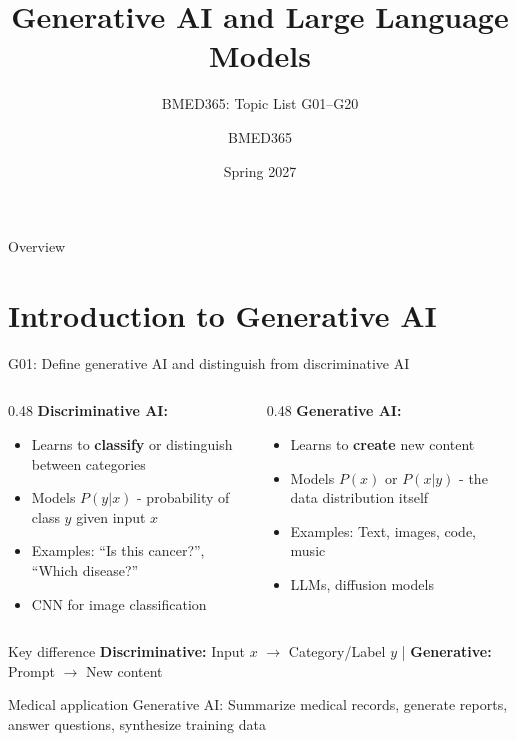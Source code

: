 \documentclass[aspectratio=169, 10pt]{beamer}
\title{Generative AI and Large Language Models}
\subtitle{BMED365: Topic List G01--G20}
\author{BMED365}
\date{Spring 2027}
\begin{document}
\begin{frame}
    \titlepage
\end{frame}

\begin{frame}{Overview}
    \tableofcontents
\end{frame}

\section{Introduction to Generative AI}

\begin{frame}{G01: Define generative AI and distinguish from discriminative AI}
    \begin{columns}[T]
        \begin{column}{0.48\textwidth}
            \textbf{Discriminative AI:}
            \begin{itemize}
                \item Learns to \textbf{classify} or distinguish between categories
                \item Models $P(y|x)$ - probability of class $y$ given input $x$
                \item Examples: ``Is this cancer?'', ``Which disease?''
                \item CNN for image classification
            \end{itemize}
        \end{column}
        \begin{column}{0.48\textwidth}
            \textbf{Generative AI:}
            \begin{itemize}
                \item Learns to \textbf{create} new content
                \item Models $P(x)$ or $P(x|y)$ - the data distribution itself
                \item Examples: Text, images, code, music
                \item LLMs, diffusion models
            \end{itemize}
        \end{column}
    \end{columns}

    \vspace{0.2cm}
    \begin{block}{\footnotesize Key difference}
        \footnotesize
        \textbf{Discriminative:} Input $x$ $\rightarrow$ Category/Label $y$ \quad | \quad
        \textbf{Generative:} Prompt $\rightarrow$ New content
    \end{block}

    \begin{alertblock}{\footnotesize Medical application}
        \footnotesize Generative AI: Summarize medical records, generate reports, answer questions, synthesize training data
    \end{alertblock}
\end{frame}
\end{document}
